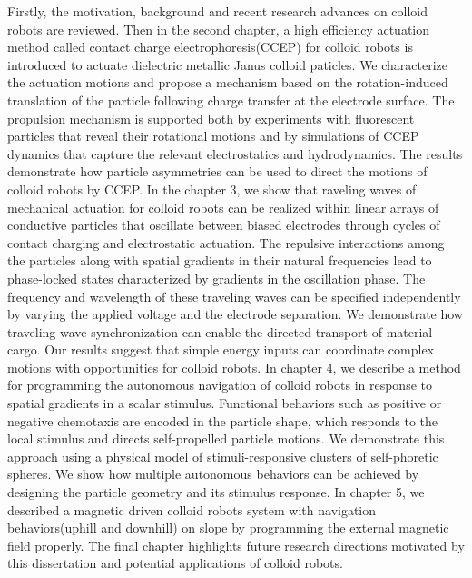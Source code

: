 \begin{titlepage}
Firstly, the motivation, background and recent research  advances on colloid robots are reviewed. Then in the second chapter, a high efficiency  actuation method called contact charge electrophoresis(CCEP) for colloid robots is introduced to actuate dielectric metallic Janus colloid paticles. We characterize the actuation motions and propose a mechanism based on the rotation-induced translation of the particle following charge transfer at the electrode surface. The propulsion mechanism is supported both by experiments with fluorescent particles that reveal their rotational motions and by simulations of CCEP dynamics that capture the relevant electrostatics and hydrodynamics. The results demonstrate how particle asymmetries can be used to direct the motions of colloid robots by CCEP. In the chapter 3, we show that raveling waves of mechanical actuation for colloid robots can be realized within linear arrays of conductive particles that oscillate between biased electrodes through cycles of contact charging and electrostatic actuation. The repulsive interactions among the particles along with spatial gradients in their natural frequencies lead to phase-locked states characterized by gradients in the oscillation phase. The frequency and wavelength of these traveling waves can be specified independently by varying the applied voltage and the electrode separation. We demonstrate how traveling wave synchronization can enable the directed transport of material cargo. Our results suggest that simple energy inputs can coordinate complex motions with opportunities for colloid robots. In chapter 4, we describe a method for programming the autonomous navigation of colloid robots in response to spatial gradients in a scalar stimulus. Functional behaviors such as positive or negative chemotaxis are encoded in the particle shape, which responds to the local stimulus and directs self-propelled particle motions. We demonstrate this approach using a physical model of stimuli-responsive clusters of self-phoretic spheres. We show how multiple autonomous behaviors can be achieved by designing the particle geometry and its stimulus response. In chapter 5, we described a magnetic driven colloid robots system with navigation behaviors(uphill and downhill) on slope by programming the external magnetic field properly. 
The final chapter  highlights future research  directions motivated by this dissertation and potential applications of colloid robots.

\vspace*{\fill}
\end{titlepage}
